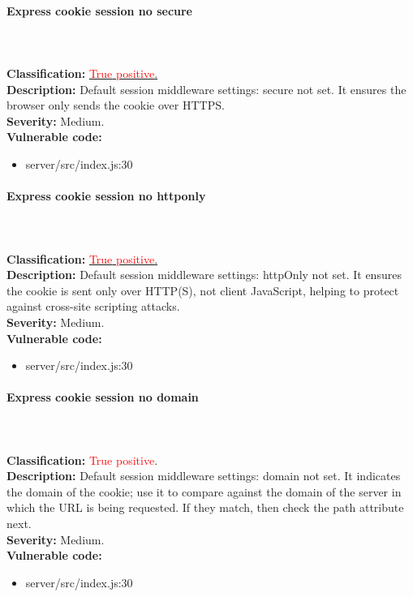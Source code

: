 \documentclass[]{article}
\begin{document}
\paragraph{Express cookie session no secure} \mbox{} \\ \\
\textbf{Classification:} \hyperref[subsubsec:sensitive_cookie_without_secure_and_httponly_attributes]{\textcolor{red}{True} \textcolor{red}{positive}.} \\ 
\textbf{Description:} Default session middleware settings: secure not set. It ensures the browser only
 sends the cookie over HTTPS. \\ 
\textbf{Severity:} Medium. \\ 
\textbf{Vulnerable code:} 
\begin{itemize}
    \item server/src/index.js:30
\end{itemize}

\paragraph{Express cookie session no httponly} \mbox{} \\ \\
\textbf{Classification:} \hyperref[subsubsec:cross_site_scripting]{\textcolor{red}{True} \textcolor{red}{positive}.} \\ 
\textbf{Description:} Default session middleware settings: httpOnly not set. It ensures the cookie is sent 
only over HTTP(S), not client JavaScript, helping to protect against cross-site scripting attacks. \\ 
\textbf{Severity:} Medium. \\ 
\textbf{Vulnerable code:} 
\begin{itemize}
    \item server/src/index.js:30
\end{itemize}

\paragraph{Express cookie session no domain} \mbox{} \\ \\
\textbf{Classification:} \textcolor{red}{True} \textcolor{red}{positive}. \\ 
\textbf{Description:} Default session middleware settings: domain not set. It indicates the domain of 
the cookie; use it to compare against the domain of the server in which the URL is being requested. 
If they match, then check the path attribute next. \\ 
\textbf{Severity:} Medium. \\ 
\textbf{Vulnerable code:} 
\begin{itemize}
    \item server/src/index.js:30
\end{itemize}
\end{document}
